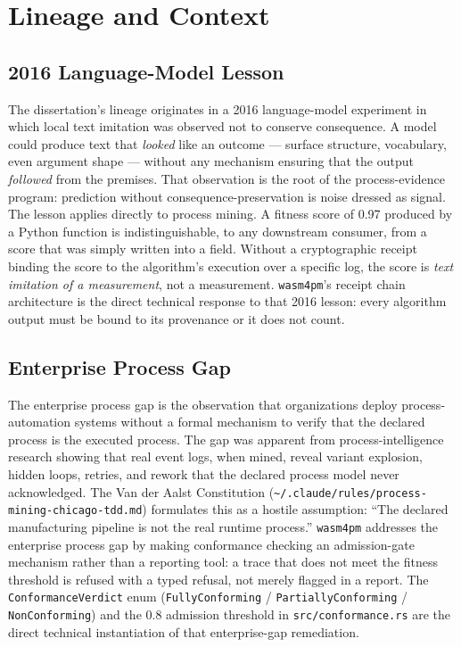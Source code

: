 \section{Lineage and Context}
\label{sec:sources-wasm4pm-lineage}

\subsection{2016 Language-Model Lesson}
\label{sec:sources-wasm4pm-lineage-2016}

The dissertation's lineage originates in a 2016 language-model experiment in which local text
imitation was observed not to conserve consequence. A model could produce text that \emph{looked}
like an outcome — surface structure, vocabulary, even argument shape — without any mechanism
ensuring that the output \emph{followed} from the premises. That observation is the root of the
process-evidence program: prediction without consequence-preservation is noise dressed as
signal. The lesson applies directly to process mining. A fitness score of 0.97 produced by
a Python function is indistinguishable, to any downstream consumer, from a score that was
simply written into a field. Without a cryptographic receipt binding the score to the algorithm's
execution over a specific log, the score is \emph{text imitation of a measurement}, not a
measurement. \texttt{wasm4pm}'s receipt chain architecture is the direct technical response to
that 2016 lesson: every algorithm output must be bound to its provenance or it does not count.

\subsection{Enterprise Process Gap}
\label{sec:sources-wasm4pm-lineage-enterprise}

The enterprise process gap is the observation that organizations deploy process-automation
systems without a formal mechanism to verify that the declared process is the executed process.
The gap was apparent from process-intelligence research showing that real event logs, when mined,
reveal variant explosion, hidden loops, retries, and rework that the declared process model never
acknowledged. The Van der Aalst Constitution (\texttt{\textasciitilde/.claude/rules/process-mining-chicago-tdd.md})
formulates this as a hostile assumption: ``The declared manufacturing pipeline is not the real
runtime process.'' \texttt{wasm4pm} addresses the enterprise process gap by making conformance
checking an admission-gate mechanism rather than a reporting tool: a trace that does not meet the
fitness threshold is refused with a typed refusal, not merely flagged in a report. The
\texttt{ConformanceVerdict} enum (\texttt{FullyConforming} / \texttt{PartiallyConforming} /
\texttt{NonConforming}) and the 0.8 admission threshold in \texttt{src/conformance.rs} are the
direct technical instantiation of that enterprise-gap remediation.

